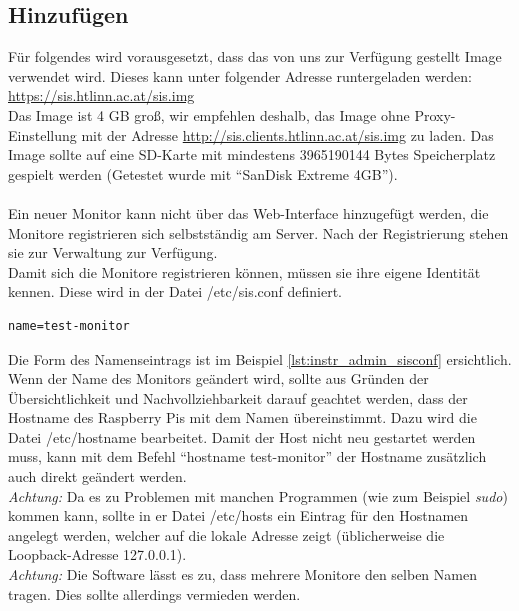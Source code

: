 \subsection{Hinzufügen}

Für folgendes wird vorausgesetzt, dass das von uns zur Verfügung gestellt Image verwendet wird. Dieses kann unter folgender Adresse runtergeladen werden:\\ \href{https://sis.htlinn.ac.at/sis.img}{https://sis.htlinn.ac.at/sis.img}\\
Das Image ist 4 GB groß, wir empfehlen deshalb, das Image ohne Proxy-Einstellung mit der Adresse \href{http://sis.clients.htlinn.ac.at/sis.img}{http://sis.clients.htlinn.ac.at/sis.img} zu laden. Das Image sollte auf eine SD-Karte mit mindestens 3965190144 Bytes Speicherplatz gespielt werden (Getestet wurde mit \enquote{SanDisk Extreme 4GB}).\\
\\
Ein neuer Monitor kann nicht über das Web-Interface hinzugefügt werden, die Monitore registrieren sich selbstständig am Server. Nach der Registrierung stehen sie zur Verwaltung zur Verfügung.\\
Damit sich die Monitore registrieren können, müssen sie ihre eigene Identität kennen. Diese wird in der Datei /etc/sis.conf definiert.\\

\begin{lstlisting}[style=custom,  caption={/etc/sis.conf},label={lst:instr_admin_sisconf}]
name=test-monitor
\end{lstlisting}
Die Form des Namenseintrags ist im Beispiel  \autoref{lst:instr_admin_sisconf} ersichtlich.\\
Wenn der Name des Monitors geändert wird, sollte aus Gründen der Übersichtlichkeit und Nachvollziehbarkeit darauf geachtet werden, dass der Hostname des Raspberry Pis mit dem Namen übereinstimmt. Dazu wird die Datei /etc/hostname bearbeitet. Damit der Host nicht neu gestartet werden muss, kann mit dem Befehl \enquote{hostname test-monitor} der Hostname zusätzlich auch direkt geändert werden.\\
\textit{Achtung:} Da es zu Problemen mit manchen Programmen (wie zum Beispiel \textit{sudo}) kommen kann, sollte in er Datei /etc/hosts ein Eintrag für den Hostnamen angelegt werden, welcher auf die lokale Adresse zeigt (üblicherweise die Loopback-Adresse 127.0.0.1).\\
\textit{Achtung:} Die Software lässt es zu, dass mehrere Monitore den selben Namen tragen. Dies sollte allerdings vermieden werden.

